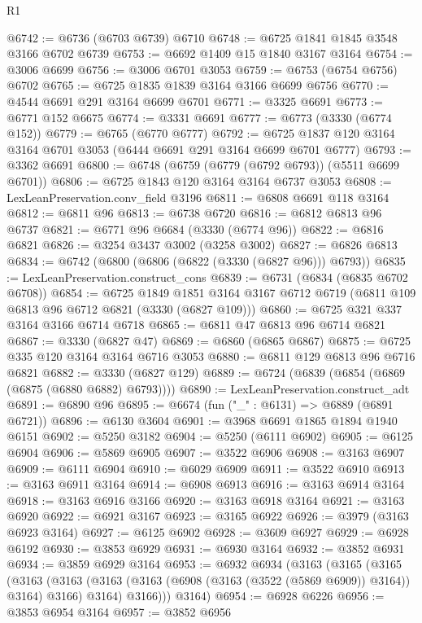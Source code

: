\begin{lexlean}{R1}
\begin{coremodule}
@6742 := @6736 (@6703 @6739) @6710
@6748 := @6725 @1841 @1845 @3548 @3166 @6702 @6739
@6753 := @6692 @1409 @15 @1840 @3167 @3164
@6754 := @3006 @6699
@6756 := @3006 @6701 @3053
@6759 := @6753 (@6754 @6756) @6702
@6765 := @6725 @1835 @1839 @3164 @3166 @6699 @6756
@6770 := @4544 @6691 @291 @3164 @6699 @6701
@6771 := @3325 @6691
@6773 := @6771 @152 @6675
@6774 := @3331 @6691
@6777 := @6773 (@3330 (@6774 @152))
@6779 := @6765 (@6770 @6777)
@6792 := @6725 @1837 @120 @3164 @3164 @6701 @3053 (@6444 @6691 @291 @3164 @6699 @6701 @6777)
@6793 := @3362 @6691
@6800 := @6748 (@6759 (@6779 (@6792 @6793)) (@5511 @6699 @6701))
@6806 := @6725 @1843 @120 @3164 @3164 @6737 @3053
@6808 := LexLeanPreservation.conv_field @3196
@6811 := @6808 @6691 @118 @3164
@6812 := @6811 @96
@6813 := @6738 @6720
@6816 := @6812 @6813 @96 @6737
@6821 := @6771 @96 @6684 (@3330 (@6774 @96))
@6822 := @6816 @6821
@6826 := @3254 @3437 @3002 (@3258 @3002)
@6827 := @6826 @6813
@6834 := @6742 (@6800 (@6806 (@6822 (@3330 (@6827 @96))) @6793))
@6835 := LexLeanPreservation.construct_cons
@6839 := @6731 (@6834 (@6835 @6702 @6708))
@6854 := @6725
    @1849
    @1851
    @3164
    @3167
    @6712
    @6719
    (@6811 @109 @6813 @96 @6712 @6821 (@3330 (@6827 @109)))
@6860 := @6725 @321 @337 @3164 @3166 @6714 @6718
@6865 := @6811 @47 @6813 @96 @6714 @6821
@6867 := @3330 (@6827 @47)
@6869 := @6860 (@6865 @6867)
@6875 := @6725 @335 @120 @3164 @3164 @6716 @3053
@6880 := @6811 @129 @6813 @96 @6716 @6821
@6882 := @3330 (@6827 @129)
@6889 := @6724 (@6839 (@6854 (@6869 (@6875 (@6880 @6882) @6793))))
@6890 := LexLeanPreservation.construct_adt
@6891 := @6890 @96
@6895 := @6674 (fun ("_" : @6131) => @6889 (@6891 @6721))
@6896 := @6130 @3604
@6901 := @3968 @6691 @1865 @1894 @1940 @6151
@6902 := @5250 @3182
@6904 := @5250 (@6111 @6902)
@6905 := @6125 @6904
@6906 := @5869 @6905
@6907 := @3522 @6906
@6908 := @3163 @6907
@6909 := @6111 @6904
@6910 := @6029 @6909
@6911 := @3522 @6910
@6913 := @3163 @6911 @3164
@6914 := @6908 @6913
@6916 := @3163 @6914 @3164
@6918 := @3163 @6916 @3166
@6920 := @3163 @6918 @3164
@6921 := @3163 @6920
@6922 := @6921 @3167
@6923 := @3165 @6922
@6926 := @3979 (@3163 @6923 @3164)
@6927 := @6125 @6902
@6928 := @3609 @6927
@6929 := @6928 @6192
@6930 := @3853 @6929
@6931 := @6930 @3164
@6932 := @3852 @6931
@6934 := @3859 @6929 @3164
@6953 := @6932
    @6934
    (@3163
      (@3165
        (@3165
          (@3163
            (@3163 (@3163 (@3163 (@6908 (@3163 (@3522 (@5869 @6909)) @3164)) @3164) @3166) @3164)
            @3166)))
      @3164)
@6954 := @6928 @6226
@6956 := @3853 @6954 @3164
@6957 := @3852 @6956

\end{coremodule}
\end{lexlean}
